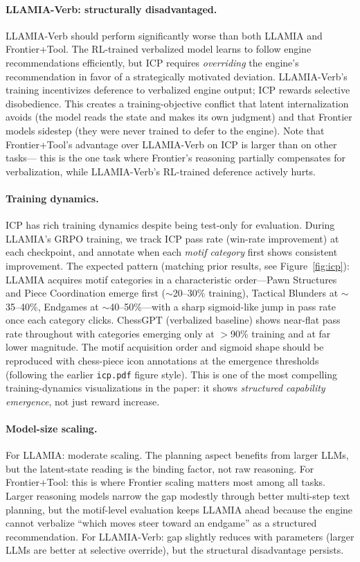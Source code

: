 \paragraph{LLAMIA-Verb: structurally disadvantaged.}
LLAMIA-Verb should perform significantly worse than both LLAMIA and
Frontier+Tool. The RL-trained verbalized model learns to follow
engine recommendations efficiently, but ICP requires
\emph{overriding} the engine's recommendation in favor of a
strategically motivated deviation. LLAMIA-Verb's training
incentivizes deference to verbalized engine output; ICP rewards
selective disobedience. This creates a training-objective conflict
that latent internalization avoids (the model reads the state and
makes its own judgment) and that Frontier models sidestep (they were
never trained to defer to the engine). Note that Frontier+Tool's
advantage over LLAMIA-Verb on ICP is larger than on other tasks---
this is the one task where Frontier's reasoning partially
compensates for verbalization, while LLAMIA-Verb's RL-trained
deference actively hurts.

\paragraph{Training dynamics.}
ICP has rich training dynamics despite being test-only for
evaluation. During LLAMIA's GRPO training, we track ICP pass rate
(win-rate improvement) at each checkpoint, and annotate when each
\emph{motif category} first shows consistent improvement. The
expected pattern (matching prior results, see
Figure~\ref{fig:icp}): LLAMIA acquires motif categories in a
characteristic order---Pawn Structures and Piece Coordination
emerge first ($\sim$20--30\% training), Tactical Blunders at
$\sim$35--40\%, Endgames at $\sim$40--50\%---with a sharp
sigmoid-like jump in pass rate once each category clicks. ChessGPT
(verbalized baseline) shows near-flat pass rate throughout with
categories emerging only at $>$90\% training and at far lower
magnitude. The motif acquisition order and sigmoid shape should be
reproduced with chess-piece icon annotations at the emergence
thresholds (following the earlier \texttt{icp.pdf} figure style).
This is one of the most compelling training-dynamics visualizations
in the paper: it shows \emph{structured capability emergence}, not
just reward increase.

\paragraph{Model-size scaling.}
For LLAMIA: moderate scaling. The planning aspect benefits from
larger LLMs, but the latent-state reading is the binding factor, not
raw reasoning.
For Frontier+Tool: this is where Frontier scaling matters most among
all tasks. Larger reasoning models narrow the gap modestly through
better multi-step text planning, but the motif-level evaluation
keeps LLAMIA ahead because the engine cannot verbalize ``which moves
steer toward an endgame'' as a structured recommendation.
For LLAMIA-Verb: gap slightly reduces with parameters (larger LLMs
are better at selective override), but the structural disadvantage
persists.

